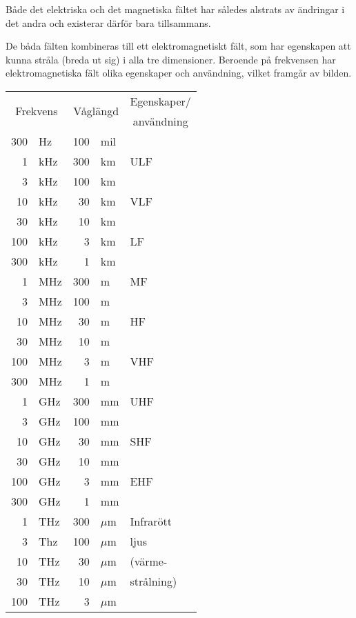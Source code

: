 Både det elektriska och det magnetiska fältet har således alstrats av ändringar i det
andra och existerar därför bara tillsammans.

De båda fälten kombineras till ett elektromagnetiskt fält, som har egenskapen att kunna
stråla (breda ut sig) i alla tre dimensioner. Beroende på frekvensen har
elektromagnetiska fält olika egenskaper och användning, vilket framgår av bilden.


\begin{center}
\begin{tabular}{|rl|rl|l|}
\hline
\multicolumn{2}{|c|}{\multirow{2}{*}{Frekvens}} & \multicolumn{2}{|c|}{\multirow{2}{*}{Våglängd}} & \multicolumn{1}{|c|}{Egenskaper/} \\
 & & & & \multicolumn{1}{|c|}{användning} \\ \hline
300 & Hz  & 100 & mil & \\
  1 & kHz & 300 & km & ULF \\ \cline{5-5}
  3 & kHz & 100 & km & \\
 10 & kHz &  30 & km & VLF \\ \cline{5-5}
 30 & kHz &  10 & km & \\
100 & kHz &   3 & km & LF \\ \cline{5-5}
300 & kHz &   1 & km & \\
  1 & MHz & 300 & m & MF \\ \cline{5-5}
  3 & MHz & 100 & m & \\
 10 & MHz &  30 & m & HF \\ \cline{5-5}
 30 & MHz &  10 & m & \\
100 & MHz &   3 & m & VHF \\ \cline{5-5}
300 & MHz &   1 & m & \\
  1 & GHz & 300 & mm & UHF \\ \cline{5-5}
  3 & GHz & 100 & mm & \\
 10 & GHz &  30 & mm & SHF \\ \cline{5-5}
 30 & GHz &  10 & mm & \\
100 & GHz &   3 & mm & EHF\\ \cline{5-5}
300 & GHz &   1 & mm & \\\
  1 & THz & 300 & \(\mu\)m & Infrarött \\
  3 & Thz & 100 & \(\mu\)m & ljus \\
 10 & THz &  30 & \(\mu\)m & (värme- \\
 30 & THz &  10 & \(\mu\)m & strålning) \\
100 & THz &   3 & \(\mu\)m & \\ \cline{5-5}

\end{tabular}
\end{center}
